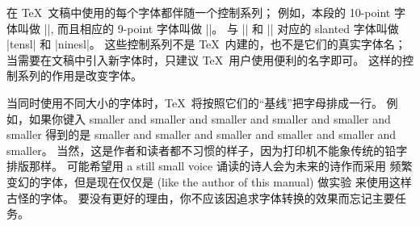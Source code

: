 在 \TeX\ 文稿中使用的每个字体都伴随一个控制系列；
例如，本段的 10-point 字体叫做 |\tenrm|, 而且相应的 9-point 字体叫做 |\ninerm|。%
与 |\tenrm| 和 |\ninerm| 对应的 slanted 字体叫做 |tensl| 和 |ninesl|。%
这些控制系列不是 \TeX\ 内建的，也不是它们的真实字体名；
当需要在文稿中引入新字体时，只建议 \TeX\ 用户使用便利的名字即可。%
这样的控制系列的作用是改变字体。

当同时使用不同大小的字体时，\TeX\ 将按照它们的``基线''把字母排成一行。%
例如，如果你键入
\begintt
\tenrm smaller \ninerm and smaller
\eightrm and smaller \sevenrm and smaller
\sixrm and smaller \fiverm and smaller \tenrm
\endtt
得到的是 {smaller \ninerm and smaller \eightrm and smaller
\sevenrm and smaller \sixrm and smaller \fiverm and smaller}。%
当然，这是作者和读者都不习惯的样子，因为打印机不能象传统的铅字排版那样。%
可能希望用 {\fiverm a still small voice} 诵读的诗人会为未来的诗作而采用%
频繁变幻的字体，但是现在仅仅是 {\fiverm(like the author of this manual)} 做实验%
来使用这样古怪的字体。%
要没有更好的理由，你不应该因追求字体转换的效果而忘记主要任务。

